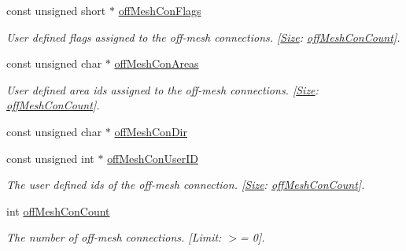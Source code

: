 \begin{Indent}
\begin{DoxyCompactItemize}
const unsigned short $\ast$ \hyperlink{structdtNavMeshCreateParams_abf0a71ee2d79f033add88835a007398d}{off\+Mesh\+Con\+Flags}
\begin{DoxyCompactList}\small\item\em User defined flags assigned to the off-\/mesh connections. \mbox{[}\hyperlink{classSize}{Size}\+: \hyperlink{structdtNavMeshCreateParams_adf244929dceba81df29f80f8869097c0}{off\+Mesh\+Con\+Count}\mbox{]}. \end{DoxyCompactList}\item 
\mbox{\label{structdtNavMeshCreateParams_a0cfe09f0deaee11dd9f953613141f0c4}} 
const unsigned char $\ast$ \hyperlink{structdtNavMeshCreateParams_a0cfe09f0deaee11dd9f953613141f0c4}{off\+Mesh\+Con\+Areas}
\begin{DoxyCompactList}\small\item\em User defined area ids assigned to the off-\/mesh connections. \mbox{[}\hyperlink{classSize}{Size}\+: \hyperlink{structdtNavMeshCreateParams_adf244929dceba81df29f80f8869097c0}{off\+Mesh\+Con\+Count}\mbox{]}. \end{DoxyCompactList}\item 
const unsigned char $\ast$ \hyperlink{structdtNavMeshCreateParams_a44a34e3c48ec498c7a84d01c2766000f}{off\+Mesh\+Con\+Dir}
\item 
\mbox{\label{structdtNavMeshCreateParams_ae947da10382d3bc215b9ad813a0d47e7}} 
const unsigned int $\ast$ \hyperlink{structdtNavMeshCreateParams_ae947da10382d3bc215b9ad813a0d47e7}{off\+Mesh\+Con\+User\+ID}
\begin{DoxyCompactList}\small\item\em The user defined ids of the off-\/mesh connection. \mbox{[}\hyperlink{classSize}{Size}\+: \hyperlink{structdtNavMeshCreateParams_adf244929dceba81df29f80f8869097c0}{off\+Mesh\+Con\+Count}\mbox{]}. \end{DoxyCompactList}\item 
\mbox{\label{structdtNavMeshCreateParams_adf244929dceba81df29f80f8869097c0}} 
int \hyperlink{structdtNavMeshCreateParams_adf244929dceba81df29f80f8869097c0}{off\+Mesh\+Con\+Count}
\begin{DoxyCompactList}\small\item\em The number of off-\/mesh connections. \mbox{[}Limit\+: $>$= 0\mbox{]}. \end{DoxyCompactList}\end{DoxyCompactItemize}
\end{Indent}
